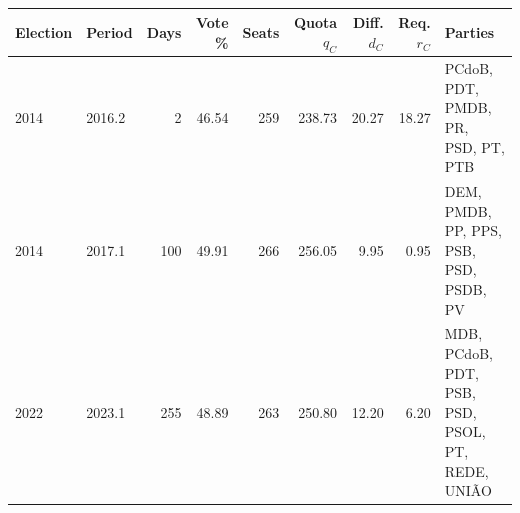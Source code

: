 \begin{tabularx}{\textwidth}{@{}llrrrrrr>{\raggedright\arraybackslash}X@{}}
\toprule
Election & Period & Days & Vote \% & Seats & Quota \(q_C\) & Diff. \(d_C\) & Req. \(r_C\) & Parties \\
\midrule
2014 & 2016.2 & 2 & 46.54 & 259 & 238.73 & 20.27 & 18.27 & PCdoB, PDT, PMDB, PR, PSD, PT, PTB \\
2014 & 2017.1 & 100 & 49.91 & 266 & 256.05 & 9.95 & 0.95 & DEM, PMDB, PP, PPS, PSB, PSD, PSDB, PV \\
2022 & 2023.1 & 255 & 48.89 & 263 & 250.80 & 12.20 & 6.20 & MDB, PCdoB, PDT, PSB, PSD, PSOL, PT, REDE, UNIÃO \\
\bottomrule
\end{tabularx}
